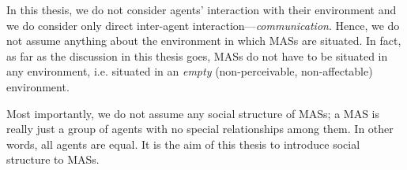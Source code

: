 In this thesis, we do not consider agents' interaction with their environment and we do consider only direct inter-agent interaction---\textit{communication}.
Hence, we do not assume anything about the environment in which MASs are situated. In fact, as far as the discussion in this thesis goes, MASs do not have to be situated in any environment, i.e. situated in an \textit{empty} (non-perceivable, non-affectable) environment.

Most importantly, we do not assume any social structure of MASs; a MAS is really just a group of agents with no special relationships among them.
In other words, all agents are equal.
It is the aim of this thesis to introduce social structure to MASs.